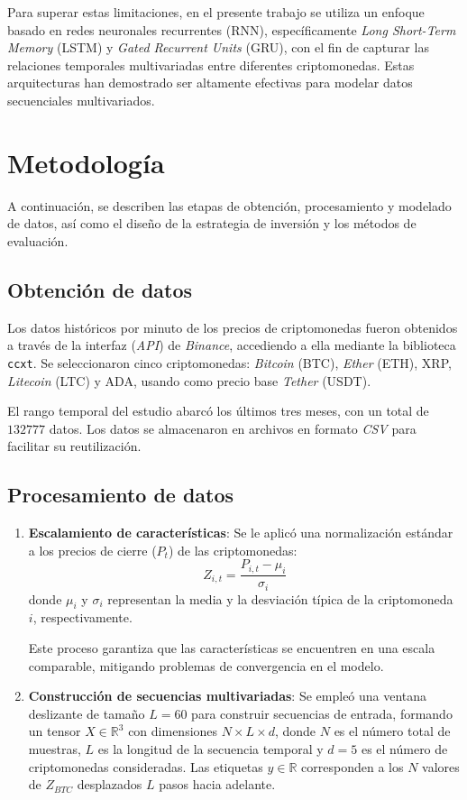 \documentclass[]{article}
\begin{document}
Para superar estas limitaciones, en el presente trabajo se utiliza un enfoque basado en redes neuronales recurrentes (RNN), específicamente \textit{Long Short-Term Memory} (LSTM) y \textit{Gated Recurrent Units} (GRU), con el fin de capturar las relaciones temporales multivariadas entre diferentes criptomonedas. Estas arquitecturas han demostrado ser altamente efectivas para modelar datos secuenciales multivariados. \cite{s22093348}

\section{Metodología}

A continuación, se describen las etapas de obtención, procesamiento y modelado de datos, así como el diseño de la estrategia de inversión y los métodos de evaluación.

\subsection{Obtención de datos}
Los datos históricos por minuto de los precios de criptomonedas fueron obtenidos a través de la interfaz (\textit{API}) de \textit{Binance}, accediendo a ella mediante la biblioteca \texttt{ccxt}. Se seleccionaron cinco criptomonedas: \textit{Bitcoin} (BTC), \textit{Ether} (ETH), XRP, \textit{Litecoin} (LTC) y ADA, usando como precio base \textit{Tether} (USDT).

El rango temporal del estudio abarcó los últimos tres meses, con un total de $132777$ datos. Los datos se almacenaron en archivos en formato \textit{CSV} para facilitar su reutilización.

\subsection{Procesamiento de datos}
\begin{enumerate}
	\item \textbf{Escalamiento de características}: Se le aplicó una normalización estándar a los precios de cierre (\(P_t\)) de las criptomonedas:
	\[
	Z_{i,t} = \frac{P_{i, t} - \mu_i}{\sigma_i}
	\]
	donde \(\mu_i\) y \(\sigma_i\) representan la media y la desviación típica de la criptomoneda \(i\), respectivamente.
	
	Este proceso garantiza que las características se encuentren en una escala comparable, mitigando problemas de convergencia en el modelo.
	
	\item \textbf{Construcción de secuencias multivariadas}: Se empleó una ventana deslizante de tamaño \(L = 60\) para construir secuencias de entrada, formando un tensor \(X \in \mathbb{R}^{3}\) con dimensiones \(N \times L \times d\), donde \(N\) es el número total de muestras, \(L\) es la longitud de la secuencia temporal y \(d = 5\) es el número de criptomonedas consideradas. Las etiquetas \(y \in \mathbb{R}\) corresponden a los \(N\) valores de \(Z_{BTC}\) desplazados \(L\) pasos hacia adelante.
\end{enumerate}
\end{document}
